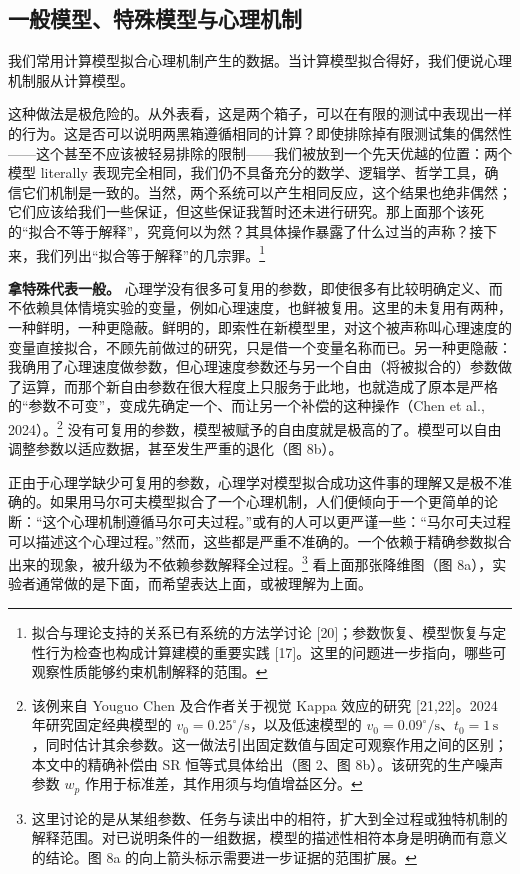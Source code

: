 \documentclass[11pt,a4paper]{article}
\begin{document}
\subsection{一般模型、特殊模型与心理机制}\label{ux4e00ux822cux6a21ux578bux7279ux6b8aux6a21ux578bux4e0eux5fc3ux7406ux673aux5236}

我们常用计算模型拟合心理机制产生的数据。当计算模型拟合得好，我们便说心理机制服从计算模型。

这种做法是极危险的。从外表看，这是两个箱子，可以在有限的测试中表现出一样的行为。这是否可以说明两黑箱遵循相同的计算？即使排除掉有限测试集的偶然性——这个甚至不应该被轻易排除的限制——我们被放到一个先天优越的位置：两个模型
literally
表现完全相同，我们仍不具备充分的数学、逻辑学、哲学工具，确信它们机制是一致的。当然，两个系统可以产生相同反应，这个结果也绝非偶然；它们应该给我们一些保证，但这些保证我暂时还未进行研究。那上面那个该死的“拟合不等于解释”，究竟何以为然？其具体操作暴露了什么过当的声称？接下来，我们列出“拟合等于解释”的几宗罪。\footnote{拟合与理论支持的关系已有系统的方法学讨论
  {[}20{]}；参数恢复、模型恢复与定性行为检查也构成计算建模的重要实践
  {[}17{]}。这里的问题进一步指向，哪些可观察性质能够约束机制解释的范围。}

\textbf{拿特殊代表一般。}
心理学没有很多可复用的参数，即使很多有比较明确定义、而不依赖具体情境实验的变量，例如心理速度，也鲜被复用。这里的未复用有两种，一种鲜明，一种更隐蔽。鲜明的，即索性在新模型里，对这个被声称叫心理速度的变量直接拟合，不顾先前做过的研究，只是借一个变量名称而已。另一种更隐蔽：我确用了心理速度做参数，但心理速度参数还与另一个自由（将被拟合的）参数做了运算，而那个新自由参数在很大程度上只服务于此地，也就造成了原本是严格的“参数不可变”，变成先确定一个、而让另一个补偿的这种操作（Chen
et al., 2024）。\footnote{该例来自 Youguo Chen 及合作者关于视觉 Kappa
  效应的研究 {[}21,22{]}。2024 年研究固定经典模型的
  \(v_0=0.25^\circ/\mathrm{s}\)，以及低速模型的
  \(v_0=0.09^\circ/\mathrm{s}\)、\(t_0=1\,\mathrm{s}\)，同时估计其余参数。这一做法引出固定数值与固定可观察作用之间的区别；本文中的精确补偿由
  SR 恒等式具体给出（图 2、图 8b）。该研究的生产噪声参数 \(w_p\)
  作用于标准差，其作用须与均值增益区分。}
没有可复用的参数，模型被赋予的自由度就是极高的了。模型可以自由调整参数以适应数据，甚至发生严重的退化（图
8b）。

正由于心理学缺少可复用的参数，心理学对模型拟合成功这件事的理解又是极不准确的。如果用马尔可夫模型拟合了一个心理机制，人们便倾向于一个更简单的论断：“这个心理机制遵循马尔可夫过程。”或有的人可以更严谨一些：“马尔可夫过程可以描述这个心理过程。”然而，这些都是严重不准确的。一个依赖于精确参数拟合出来的现象，被升级为不依赖参数解释全过程。\footnote{这里讨论的是从某组参数、任务与读出中的相符，扩大到全过程或独特机制的解释范围。对已说明条件的一组数据，模型的描述性相符本身是明确而有意义的结论。图
  8a 的向上箭头标示需要进一步证据的范围扩展。} 看上面那张降维图（图
8a），实验者通常做的是下面，而希望表达上面，或被理解为上面。
\end{document}
